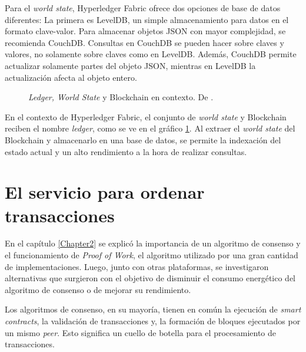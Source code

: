 Para el \textit{world state}, Hyperledger Fabric ofrece dos opciones de base de datos diferentes: La primera es LevelDB, un simple almacenamiento para datos en el formato clave-valor. Para almacenar objetos JSON con mayor complejidad, se recomienda CouchDB. Consultas en CouchDB se pueden hacer sobre claves y valores, no solamente sobre claves como en LevelDB. Además, CouchDB permite actualizar solamente partes del objeto JSON, mientras en LevelDB la actualización afecta al objeto entero.

\begin{figure}[H]
    \caption{\textit{Ledger, World State} y Blockchain en contexto. De \cite{hlf-ledger}.}
    \label{fig:bc_ledger}
\end{figure}

En el contexto de Hyperledger Fabric, el conjunto de \textit{world state} y Blockchain reciben el nombre \textit{ledger}, como se ve en el gráfico \ref{fig:bc_ledger}. Al extraer el \textit{world state} del Blockchain y almacenarlo en una base de datos, se permite la indexación del estado actual y un alto rendimiento a la hora de realizar consultas.

\section{El servicio para ordenar transacciones}
\label{sec:ordering_service}
En el capítulo \ref{Chapter2} se explicó la importancia de un algoritmo de consenso y el funcionamiento de \textit{Proof of Work}, el algoritmo utilizado por una gran cantidad de implementaciones. Luego, junto con otras plataformas, se investigaron alternativas que surgieron con el objetivo de disminuir el consumo energético del algoritmo de consenso o de mejorar su rendimiento.

Los algoritmos de consenso, en su mayoría, tienen en común la ejecución de \textit{smart contracts}, la validación de transacciones y, la formación de bloques ejecutados por un mismo \textit{peer}. Esto significa un cuello de botella para el procesamiento de transacciones.

